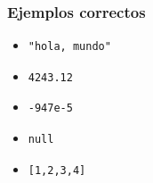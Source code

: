 \documentclass[ucs]{beamer}
\begin{document}
\begin{frame}[fragile]
\frametitle{Ejemplos correctos}
\begin{itemize}
\item
  \begin{footnotesize}
  \begin{verbatim}
"hola, mundo"
  \end{verbatim}
  \end{footnotesize}

\item

  \begin{footnotesize}
  \begin{verbatim}
4243.12
  \end{verbatim}
  \end{footnotesize}

\item
  \begin{footnotesize}
  \begin{verbatim}
-947e-5
  \end{verbatim}
  \end{footnotesize}

\item
  \begin{footnotesize}
  \begin{verbatim}
null
  \end{verbatim}
  \end{footnotesize}


\item
  \begin{footnotesize}
  \begin{verbatim}
[1,2,3,4]
  \end{verbatim}
  \end{footnotesize}


\end{itemize}
\end{frame}
\end{document}
